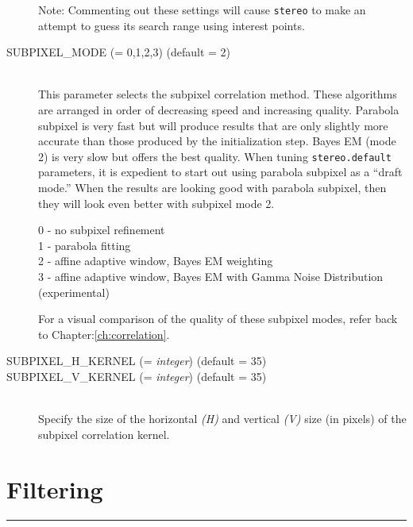 \begin{description}
  Note: Commenting out these settings will cause \texttt{stereo} to make an
  attempt to guess its search range using interest points.

\item[SUBPIXEL\_MODE \textnormal{\small{(= 0,1,2,3)}} (default = 2)] \hfill \\
  This parameter selects the subpixel correlation method. These
  algorithms are arranged in order of decreasing speed and increasing
  quality. Parabola subpixel is very fast but will produce results
  that are only slightly more accurate than those produced by the
  initialization step. Bayes EM (mode 2) is very slow but offers the
  best quality. When tuning {\tt stereo.default} parameters, it is
  expedient to start out using parabola subpixel as a ``draft mode.''
  When the results are looking good with parabola subpixel, then they
  will look even better with subpixel mode 2.

  \begin{description}
    \item[0 - no subpixel refinement]
    \item[1 - parabola fitting ]
    \item[2 - affine adaptive window, Bayes EM weighting ]
    \item[3 - affine adaptive window, Bayes EM with Gamma Noise Distribution (experimental) ]
  \end{description}

  For a visual comparison of the quality of these subpixel modes,
  refer back to Chapter:\ref{ch:correlation}.

\item[SUBPIXEL\_H\_KERNEL \textnormal{\small{(= \emph{integer})}} (default = 35)]
\item[SUBPIXEL\_V\_KERNEL \textnormal{\small{(= \emph{integer})}} (default = 35)] \hfill \\
  Specify the size of the horizontal \emph{(H)} and vertical
  \emph{(V)} size (in pixels) of the subpixel correlation kernel.

\end{description}


\section{Filtering}
\hrule
\bigskip

